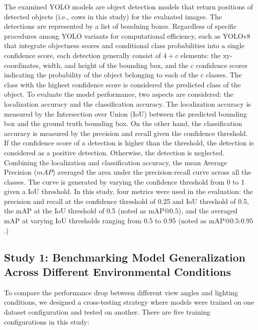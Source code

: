 The examined YOLO models are object detection models that return positions of detected objects (i.e., cows in this study) for the evaluated images. The detections are represented by a list of boudning boxes. Regardless of specific procedures among YOLO variants for computational efficiency, such as YOLOv8 that integrate objectness scores and conditional class probabilities into a single confidence score, each detection generally consist of $4+c$ elements: the xy-coordinates, width, and height of the bounding box, and the $c$ confidence scores indicating the probability of the object belonging to each of the $c$ classes. The class with the highest confidence score is considered the predicted class of the object. To evaluate the model performance, two aspects are considered: the localization accuracy and the classification accuracy. The localization accuracy is measured by the Intersection over Union (IoU) between the predicted bounding box and the ground truth bounding box. On the other hand, the classification accuracy is measured by the precision and recall given the confidence threshold. If the confidence score of a detection is higher than the threshold, the detection is considered as a positive detection. Otherwise, the detection is neglected. Combining the localization and classification accuracy, the mean Average Precision ($mAP$) averaged the area under the precision-recall curve across all the classes. The curve is generated by varying the confidence threshold from 0 to 1 given a IoU threshold. In this study, four metrics were used in the evaluation: the precision and recall at the confidence threshold of 0.25 and IoU threshold of 0.5, the mAP at the IoU threshold of 0.5 (noted as $\text{mAP@{0.5}}$), and the averaged mAP at varying IoU thresholds ranging from 0.5 to 0.95 (noted as $\text{mAP@{0.5:0.95}}$.)


\subsection*{Study 1: Benchmarking Model Generalization Across Different Environmental Conditions}

To compare the performance drop between different view angles and lighting conditions, we designed a cross-testing strategy where models were trained on one dataset configuration and tested on another. There are five training configurations in this study:

